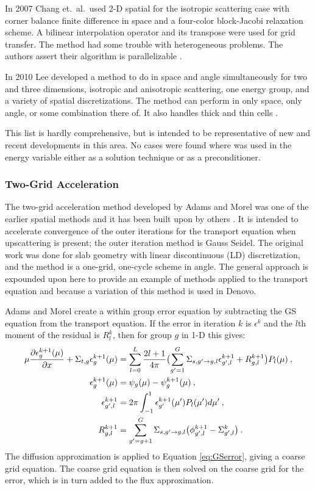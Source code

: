 In 2007 Chang et.\ al.\ used 2-D spatial \mg for the isotropic scattering case with corner balance finite difference in space and a four-color block-Jacobi relaxation scheme. A bilinear interpolation operator and its transpose were used for grid transfer. The method had some trouble with heterogeneous problems. The authors assert their algorithm is parallelizable \cite{Chang2007}.

In 2010 Lee developed a method to do \mg in space and angle simultaneously for two and three dimensions, isotropic and anisotropic scattering, one energy group, and a variety of spatial discretizations. The method can perform \mg in only space, only angle, or some combination there of. It also handles thick and thin cells \cite{Lee2010}.

This list is hardly comprehensive, but is intended to be representative of new and recent developments in this area. No cases were found where \mg was used in the energy variable either as a solution technique or as a preconditioner. 

\subsubsection{Two-Grid Acceleration}
The two-grid acceleration method developed by Adams and Morel was one of the earlier spatial \mg methods and it has been built upon by others \cite{Adams1993}. It is intended to accelerate convergence of the outer iterations for the transport equation when upscattering is present; the outer iteration method is Gauss Seidel. The original work was done for slab geometry with linear discontinuous (LD) discretization, and the method is a one-grid, one-cycle scheme in angle. The general approach is expounded upon here to provide an example of \mg methods applied to the transport equation and because a variation of this method is used in Denovo. 

Adams and Morel create a within group error equation by subtracting the GS equation from the transport equation. If the error in iteration $k$ is $\epsilon^k$ and the $l$th moment of the residual is $R_l^k$, then for group $g$ in 1-D this gives:
%
\begin{align}
   \mu \frac{\partial \epsilon_{g}^{k+1}(\mu)}{\partial x} + \Sigma_{t,g} \epsilon_{g}^{k+1}(\mu) &= \sum_{l=0}^{L}\frac{2l+1}{4\pi} \bigl( \sum_{g'=1}^{G}\Sigma_{s,g' \to g, l} \epsilon_{g',l}^{k+1} 
   +  R_{g,l}^{k+1}\bigr) P_{l}(\mu) \:,\label{eq:GSerror} \\
  \epsilon_{g}^{k+1}(\mu) &= \psi_{g}(\mu) - \psi_{g}^{k+1}(\mu) \:, \\
  \epsilon_{g',l}^{k+1} &= 2\pi \int_{-1}^{1}\epsilon_{g'}^{k+1}(\mu') P_{l}(\mu') d\mu' \:, \\ 
  R_{g,l}^{k+1} &=  \sum_{g'=g+1}^{G}\Sigma_{s,g' \to g, l} \bigl( \phi_{g',l}^{k+1} - \Sigma_{g',l}^{k} \bigr) \:.
\end{align}
%
The diffusion approximation is applied to Equation \eqref{eq:GSerror}, giving a coarse grid equation. The coarse grid equation is then solved on the coarse grid for the error, which is in turn added to the flux approximation. 

